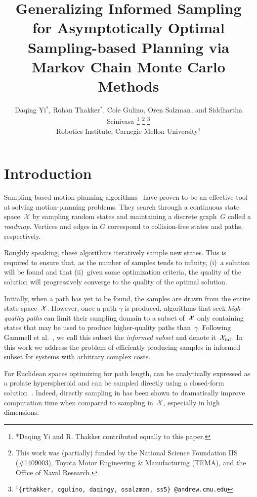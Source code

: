 \documentclass[letterpaper, 10 pt, conference]{ieeeconf}  %
\title{\LARGE \bf
Generalizing Informed Sampling
for Asymptotically Optimal Sampling-based Planning via Markov Chain
Monte Carlo Methods
}
\author{
Daqing Yi$^{*}$,
Rohan Thakker$^{*}$,
Cole Gulino$^{}$, 
Oren Salzman$^{}$, and
Siddhartha Srinivasa$^{}$%
\thanks{*Daqing Yi and R. Thakker contributed equally to this paper.}
\thanks{This work was (partially) funded by the National Science Foundation IIS (\#1409003), Toyota Motor Engineering \& Manufacturing (TEMA), and the Office of Naval Research.}%
\thanks{$^{1}${\tt\small \{rthakker, cgulino, daqingy, osalzman, ss5\} @andrew.cmu.edu}}%
%
\\        
Robotics Institute, Carnegie Mellon University$^{1}$
}
\begin{document}
\maketitle
\thispagestyle{empty}
\pagestyle{empty}


\begin{abstract}

\end{abstract}


\section{Introduction}
\label{sec:intro}


Sampling-based motion-planning algorithms~\cite{CBHKKLT05, L06} have proven to be an effective tool at solving motion-planning problems.
They search through a continuous state space~$\mathcal{X}$ by sampling random states and maintaining a discrete graph~$G$ called a \emph{roadmap}.
Vertices and edges in $G$ correspond to collision-free states and paths, respectively.

Roughly speaking, these algorithms iteratively sample new states.
This is required to ensure that, as the number of samples tends to infinity, 
(i)~a solution will be found 
and that
(ii)~given some optimization criteria, the quality of the solution will progressively converge to the quality of the optimal solution.

Initially, 
when a path has yet to be found, 
the samples are drawn from the entire state space~$\mathcal{X}$.
However, once a path $\gamma$ is produced,  algorithms that seek \emph{high-quality paths} can limit their sampling domain to a subset of~$\mathcal{X}$ only  containing states that may be used to produce higher-quality paths than~$\gamma$.
Following Gammell et al.~\cite{GSB14}, we call this subset the \emph{informed subset} and denote it~$\mathcal{X}_{\rm {inf}}$.
In this work we address the problem of efficiently producing samples in informed subset for systems with arbitrary complex costs. 

For Euclidean spaces optimizing for path length, 
\Cinf can be analytically expressed as a prolate hyperspheroid and can be sampled directly using a closed-form solution~\cite{GSB14}.
Indeed, directly sampling in \Cinf has been shown to dramatically improve computation time when compared to sampling in~$\mathcal{X}$, especially in high dimensions. 
\end{document}
